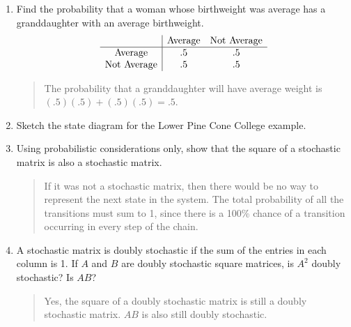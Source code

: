 \documentclass{hw}
\begin{document}
\begin{enumerate}
\item Find the probability that a woman whose birthweight was average has a granddaughter with an
average birthweight.
\[
\begin{array}{c | c c}
& \text{Average} & \text{Not Average}\\
\hline
\text{Average} & .5 & .5\\
\text{Not Average} & .5 & .5
\end{array}
\]
\begin{quote}
The probability that a granddaughter will have average weight is $(.5)(.5) + (.5)(.5)=.5$.
\end{quote}

\item Sketch the state diagram for the Lower Pine Cone College example.
\begin{center}
\end{center}

\setcounter{enumi}{10}

\item Using probabilistic considerations only, show that the square of a stochastic matrix is also a
stochastic matrix.
\begin{quote}
If it was not a stochastic matrix, then there would be no way to represent the next state in the
system. The total probability of all the transitions must sum to 1, since there is a 100\% chance
of a transition occurring in every step of the chain.
\end{quote}

\item A stochastic matrix is doubly stochastic if the sum of the entries in each column is 1. If $A$
and $B$ are doubly stochastic square matrices, is $A^{2}$ doubly stochastic? Is $AB$?
\begin{quote}
Yes, the square of a doubly stochastic matrix is still a doubly stochastic matrix. $AB$ is also
still doubly stochastic.
\end{quote}


\end{enumerate}
\end{document}
